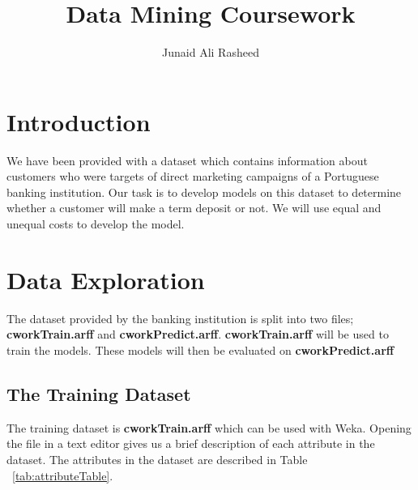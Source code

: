 \documentclass[a4paper,11pt]{article}
\title{Data Mining Coursework}
\author{Junaid Ali Rasheed}
\begin{document}
\maketitle

\begin{abstract}
\end{abstract}

\section{Introduction}
We have been provided with a dataset which contains information about customers
who were targets of direct marketing campaigns of a Portuguese banking institution.
Our task is to develop models on this dataset to determine whether a customer
will make a term deposit or not. We will use equal and unequal costs to develop
the model.

\section{Data Exploration}

The dataset provided by the banking institution is split into two files; \textbf{cworkTrain.arff} and
\textbf{cworkPredict.arff}. \textbf{cworkTrain.arff} will be used to train the models. These models
will then be evaluated on \textbf{cworkPredict.arff}

\subsection{The Training Dataset}

The training dataset is \textbf{cworkTrain.arff} which can be used with Weka. Opening
the file in a text editor gives us a brief description of each attribute in the dataset.
The attributes in the dataset are described in Table ~\ref{tab:attributeTable}.
\end{document}
